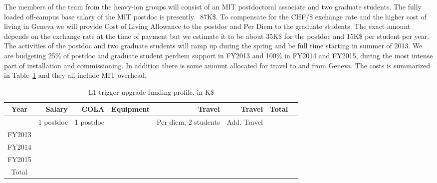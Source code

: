 The members of the team from the heavy-ion groups will consist of an MIT postdoctoral associate and two graduate students. The fully loaded off-campus base salary of the MIT postdoc is presently ~87K\$. To compensate for the CHF/\$ exchange rate and the higher cost of living in Geneva we will provide Cost of Living Allowance to the postdoc and Per Diem to the graduate students. The exact amount depends on the exchange rate at the time of payment but we estimate it to be about 35K\$ for the postdoc and 15K\$ per student per year.  The activities of the postdoc and two graduate students will ramp up during the spring and be full time starting in summer of 2013. We are budgeting 25\% of postdoc and graduate student perdiem support in FY2013 and 100\% in FY2014 and FY2015, during the most intense part of installation and commissioning. In addition there is some amount allocated for travel to and from Geneva. The costs is summarized in Table~\ref{OpCost} and they all include MIT overhead.

\begin{table}[hbt]
\begin{center}
\begin{tabular}{|c|r|r|r|r|r|r|r|}
\hline
Year        & Salary & COLA & Equipment & Travel & Travel& Total \\ \hline
            &  1 postdoc   & 1 postdoc   &  & Per diem, 2 students       &  Add. Travel     &     \\ \hline
FY2013      &     &    &       &   &       &     \\ \hline
FY2014      &     &    &     &  &       &   \\ \hline
FY2015      &     &    &          &  &       &   \\ \hline
Total       &     &    &       &  &      &    \\ \hline
\end{tabular}
\end{center}
\caption{L1 trigger upgrade funding profile, in K\$}
\label{OpCost}
\end{table}
